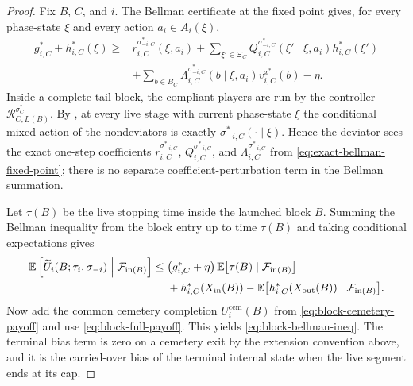\documentclass[12pt]{article}
\theoremstyle{definition}
\newcommand{\E}{\mathbb{E}}
\newcommand{\1}{\mathbf{1}}
\newcommand{\cF}{\mathcal{F}}
\begin{document}
\begin{proof}
Fix $B$, $C$, and $i$. The Bellman certificate at the fixed point gives, for
every phase-state $\xi$ and every action $a_i\in A_i(\xi)$,
\begin{align}
\label{eq:exact-bellman-fixed-point}
g_{i,C}^* + h_{i,C}^*(\xi)
\ge {}
&r_{i,C}^{\sigma_{-i,C}^*}(\xi,a_i)
+
\sum_{\xi'\in\Xi_C}Q_{i,C}^{\sigma_{-i,C}^*}(\xi'\mid\xi,a_i)h_{i,C}^*(\xi')
\\
&+
\sum_{b\in B_C}\Lambda_{i,C}^{\sigma_{-i,C}^*}(b\mid\xi,a_i)v_{i,C}^{x^*}(b)
-\eta.
\nonumber
\end{align}
Inside a complete tail block, the compliant players are run by the controller
$\mathcal R_{C,L(B)}^{\sigma_C^*}$. By , at every live
stage with current phase-state $\xi$ the conditional mixed action of the
nondeviators is exactly $\sigma_{-i,C}^*(\cdot\mid\xi)$. Hence the deviator sees
the exact one-step coefficients
$r_{i,C}^{\sigma_{-i,C}^*}$, $Q_{i,C}^{\sigma_{-i,C}^*}$, and
$\Lambda_{i,C}^{\sigma_{-i,C}^*}$ from
\eqref{eq:exact-bellman-fixed-point}; there is no separate
coefficient-perturbation term in the Bellman summation.

Let $\tau(B)$ be the live stopping time inside the launched block $B$. Summing
the Bellman inequality from the block entry up to time $\tau(B)$ and taking
conditional expectations gives
\begin{align*}
\E\left[\widetilde U_i(B;\tau_i,\sigma_{-i})\Bigm|\cF_{\mathrm{in}(B)}\right]
\le{}&
\bigl(g_{i,C}^*+\eta\bigr)\,
\E\bigl[\tau(B)\mid\cF_{\mathrm{in}(B)}\bigr]
\\
&+
h_{i,C}^*(X_{\mathrm{in}}(B))
-
\E\bigl[h_{i,C}^*(X_{\mathrm{out}}(B))\mid\cF_{\mathrm{in}(B)}\bigr].
\end{align*}
Now add the common cemetery completion $U_i^{\mathrm{cem}}(B)$ from
\eqref{eq:block-cemetery-payoff} and use \eqref{eq:block-full-payoff}. This yields
\eqref{eq:block-bellman-ineq}. The terminal bias term is zero on a cemetery exit
by the extension convention above, and it is the carried-over bias of the
terminal internal state when the live segment ends at its cap.
\end{proof}
\end{document}

